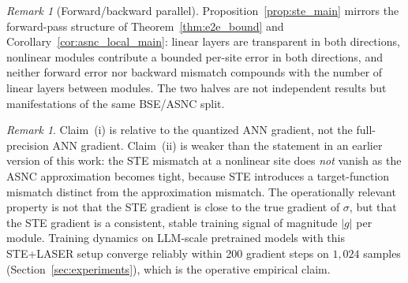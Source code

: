 \documentclass{article}
\theoremstyle{plain}
\theoremstyle{definition}
\theoremstyle{remark}
\newtheorem{remark}[theorem]{Remark}
\begin{document}
\begin{remark}[Forward/backward parallel]
\label{rem:fwd_bwd}
Proposition~\ref{prop:ste_main} mirrors the forward-pass structure of
Theorem~\ref{thm:e2e_bound} and
Corollary~\ref{cor:asnc_local_main}: linear layers are transparent in both
directions, nonlinear modules contribute a bounded per-site error in both
directions, and neither forward error nor backward mismatch compounds with
the number of linear layers between modules. The two halves are not
independent results but manifestations of the same BSE/ASNC split.
\end{remark}

\begin{remark}
Claim~(i) is relative to the quantized ANN gradient, not the
full-precision ANN gradient. Claim~(ii) is weaker than the statement in an
earlier version of this work: the STE mismatch at a nonlinear site does
\emph{not} vanish as the ASNC approximation becomes tight, because STE
introduces a target-function mismatch distinct from the approximation
mismatch. The operationally relevant property is not that the STE gradient
is close to the true gradient of $\sigma$, but that the STE gradient is a
consistent, stable training signal of magnitude $|g|$ per module. Training
dynamics on LLM-scale pretrained models with this STE+LASER setup converge
reliably within 200 gradient steps on $1{,}024$ samples
(Section~\ref{sec:experiments}), which is the operative empirical claim.
\end{remark}




\end{document}
